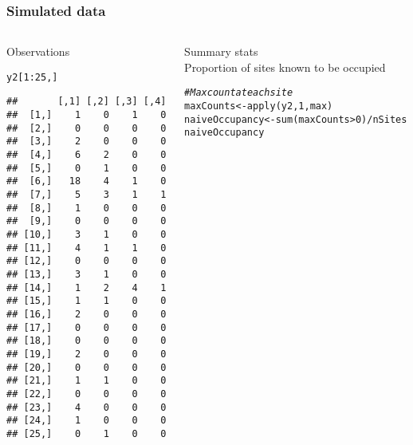 \documentclass[color=usenames,dvipsnames]{beamer}\usepackage[]{graphicx}\usepackage[]{color}
\makeatletter
\newcommand{\hlnum}[1]{\textcolor[rgb]{0.69,0.494,0}{#1}}%
\newcommand{\hlcom}[1]{\textcolor[rgb]{0.514,0.506,0.514}{\textit{#1}}}%
\newcommand{\hlopt}[1]{\textcolor[rgb]{0,0,0}{#1}}%
\newcommand{\hlstd}[1]{\textcolor[rgb]{0,0,0}{#1}}%
\newcommand{\hlkwb}[1]{\textcolor[rgb]{0,0.341,0.682}{#1}}%
\newcommand{\hlkwd}[1]{\textcolor[rgb]{0.004,0.004,0.506}{#1}}%
\newenvironment{kframe}{%
 \def\at@end@of@kframe{}%
 \ifinner\ifhmode%
  \def\at@end@of@kframe{\end{minipage}}%
  \begin{minipage}{\columnwidth}%
 \fi\fi%
 \def\FrameCommand##1{\hskip\@totalleftmargin \hskip-\fboxsep
 \colorbox{shadecolor}{##1}\hskip-\fboxsep
     \hskip-\linewidth \hskip-\@totalleftmargin \hskip\columnwidth}%
 \MakeFramed {\advance\hsize-\width
   \@totalleftmargin\z@ \linewidth\hsize
   \@setminipage}}%
 {\par\unskip\endMakeFramed%
 \at@end@of@kframe}
\newenvironment{knitrout}{}{} %
\makeatother
\begin{document}
\begin{frame}[fragile]
  \frametitle{Simulated data}
  \begin{columns}
    \begin{column}{0.4\textwidth}
      \small
      Observations
  \vspace{-6pt}
\begin{knitrout}\tiny
{}\color{fgcolor}\begin{kframe}
\begin{alltt}
\hlstd{y2[}\hlnum{1}\hlopt{:}\hlnum{25}\hlstd{,]}
\end{alltt}
\begin{verbatim}
##       [,1] [,2] [,3] [,4]
##  [1,]    1    0    1    0
##  [2,]    0    0    0    0
##  [3,]    2    0    0    0
##  [4,]    6    2    0    0
##  [5,]    0    1    0    0
##  [6,]   18    4    1    0
##  [7,]    5    3    1    1
##  [8,]    1    0    0    0
##  [9,]    0    0    0    0
## [10,]    3    1    0    0
## [11,]    4    1    1    0
## [12,]    0    0    0    0
## [13,]    3    1    0    0
## [14,]    1    2    4    1
## [15,]    1    1    0    0
## [16,]    2    0    0    0
## [17,]    0    0    0    0
## [18,]    0    0    0    0
## [19,]    2    0    0    0
## [20,]    0    0    0    0
## [21,]    1    1    0    0
## [22,]    0    0    0    0
## [23,]    4    0    0    0
## [24,]    1    0    0    0
## [25,]    0    1    0    0
\end{verbatim}
\end{kframe}
\end{knitrout}
  \end{column}
  \begin{column}{0.6\textwidth}
    \pause
    {\centering Summary stats \\}
    \vspace{24pt}
    \small
    Proportion of sites known to be occupied
    \vspace{-6pt}
\begin{knitrout}\scriptsize
{}\color{fgcolor}\begin{kframe}
\begin{alltt}
\hlcom{# Max count at each site}
\hlstd{maxCounts} \hlkwb{<-} \hlkwd{apply}\hlstd{(y2,} \hlnum{1}\hlstd{, max)}
\hlstd{naiveOccupancy} \hlkwb{<-} \hlkwd{sum}\hlstd{(maxCounts}\hlopt{>}\hlnum{0}\hlstd{)}\hlopt{/}\hlstd{nSites}
\hlstd{naiveOccupancy}
\end{alltt}
\begin{verbatim}

\end{verbatim}
\end{kframe}
\end{knitrout}
\end{column}
\end{columns}
\end{frame}
\end{document}
